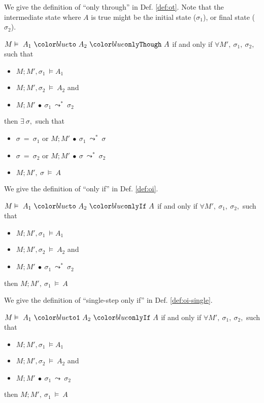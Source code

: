 \documentclass[acmsmall,review,anonymous]{acmart}\settopmatter{printfolios=true,printccs=false,printacmref=false}
\begin{document}
We give the definition of ``only  through'' in Def. \ref{def:ot}. Note 
that the intermediate state where $A$ is true might be the initial state ($\sigma_1$),
or final state ($\sigma_2$). 
\begin{definition}
\label{def:ot}
$M \vDash\ \onlyThrough {A_1}{A_2}{A}$ if and only if
$\forall M',\ \sigma_1,\ \sigma_2,$ such that 
\begin{itemize}
\item
$M ; M', \sigma_1\ \vDash A_1$
\item
$M ; M', \sigma_2\ \vDash\ A_2$ and
\item
$M ; M'\ \bullet\ \sigma_1\ \leadsto^*\ \sigma_2$
\end{itemize}
then $\exists\ \sigma,$ such that
\begin{itemize}
\item
$\sigma\ =\ \sigma_1$ or $M ; M'\ \bullet\ \sigma_1\ \leadsto^*\ \sigma$
\item
$\sigma\ =\ \sigma_2$ or $M ; M'\ \bullet\ \sigma\ \leadsto^*\ \sigma_2$
\item
$M ; M',\ \sigma\ \vDash\ A$
\end{itemize}
\end{definition}

We give the definition of ``only if'' in Def. \ref{def:oi}.
\begin{definition}
\label{def:oi}
$M \vDash\ \onlyIf {A_1}{A_2}{A}$ if and only if
$\forall M',\ \sigma_1,\ \sigma_2,$ such that 
\begin{itemize}
\item
$M ; M', \sigma_1\ \vDash A_1$
\item
$M ; M', \sigma_2\ \vDash\ A_2$ and
\item
$M ; M'\ \bullet\ \sigma_1\ \leadsto^*\ \sigma_2$
\end{itemize}
then $M ; M',\ \sigma_1\ \vDash\ A$
\end{definition} 

We give the definition of ``single-step only if'' in Def. \ref{def:oi-single}.
\begin{definition}
\label{def:oi-single}
$M \vDash\ \onlyIfSingle {A_1}{A_2}{A}$ if and only if
$\forall M',\ \sigma_1,\ \sigma_2,$ such that 
\begin{itemize}
\item
$M ; M', \sigma_1\ \vDash A_1$
\item
$M ; M', \sigma_2\ \vDash\ A_2$ and
\item
$M ; M'\ \bullet\ \sigma_1\ \leadsto\ \sigma_2$
\end{itemize}
then $M ; M',\ \sigma_1\ \vDash\ A$
\end{definition}
\end{document}
